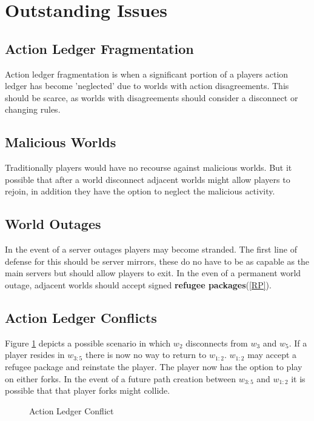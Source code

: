 \documentclass[runningheads,a4paper]{llncs}
\newcommand*{\StrikeThruDistance}{0.15cm}%
\newcommand*{\StrikeThru}{\StrikeThruDistance,\StrikeThruDistance}%
\begin{document}
\section{Outstanding Issues}
\subsection{Action Ledger Fragmentation}
\label{ALF}
Action ledger fragmentation is when a significant portion of a players action ledger has become 'neglected' due to worlds with action disagreements. This should be scarce, as worlds with disagreements should consider a disconnect or changing rules.

\subsection{Malicious Worlds}
Traditionally players would have no recourse against malicious worlds. But it possible that after a world disconnect adjacent worlds might allow players to rejoin, in addition they have the option to neglect the malicious activity.

\subsection{World Outages}
\label{WO}
In the event of a server outages players may become stranded. The first line of defense for this should be server mirrors, these do no have to be as capable as the main servers but should allow players to exit. In the even of a permanent world outage, adjacent worlds should accept signed \textbf{refugee packages}(\ref{RP}).

\subsection{Action Ledger Conflicts}
\label{ALC}
Figure \ref{fALC} depicts a possible scenario in which $w_2$ disconnects from $w_3$ and $w_5$. If a player resides in $w_{3:5}$ there is now no way to return to $w_{1:2}$. $w_{1:2}$ may accept a refugee package and reinstate the player. The player now has the option to play on either forks. In the event of a future path creation between $w_{3:5}$ and $w_{1:2}$
it is possible that that player forks might collide.

\begin{figure}
\caption{Action Ledger Conflict}
\label{fALC}
\begin{center}
\end{center}
\end{figure}
\end{document}
